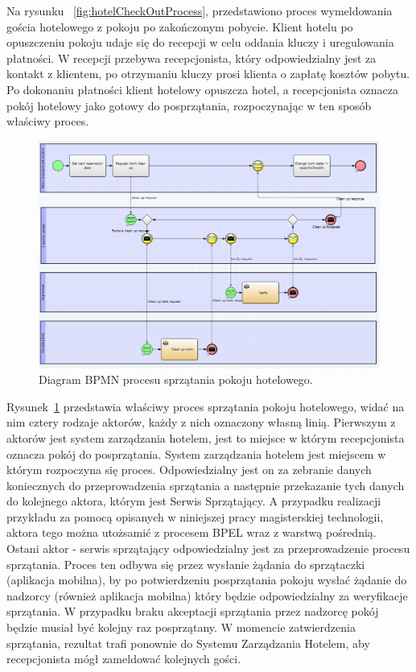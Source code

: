 Na rysunku ~\ref{fig:hotelCheckOutProcess}, przedstawiono proces wymeldowania gościa hotelowego z pokoju po zakończonym pobycie. Klient hotelu po opuszczeniu pokoju udaje się do recepcji w celu oddania kluczy i uregulowania płatności. W recepcji przebywa recepcjonista, który odpowiedzialny jest za kontakt z klientem, po otrzymaniu kluczy prosi klienta o zapłatę kosztów pobytu. Po dokonaniu płatności klient hotelowy opuszcza hotel, a recepcjonista oznacza pokój hotelowy jako gotowy do posprzątania, rozpoczynając w ten sposób właściwy proces. 

\begin{figure}[h]
\centerline{\includegraphics[scale=0.4]{roomCleanUpProcess}}
\caption{Diagram BPMN procesu sprzątania pokoju hotelowego.}
\label{fig:roomCleanUpProcess}
\end{figure}

Rysunek~\ref{fig:roomCleanUpProcess} przedstawia właściwy proces sprzątania pokoju hotelowego, widać na nim cztery rodzaje aktorów, każdy z nich oznaczony własną linią. Pierwszym z aktorów jest system zarządzania hotelem, jest to miejsce w którym recepcjonista oznacza pokój do posprzątania. System zarządzania hotelem jest miejscem w którym rozpoczyna się proces. Odpowiedzialny jest on za zebranie danych koniecznych do przeprowadzenia sprzątania a następnie przekazanie tych danych do kolejnego aktora, którym jest Serwis Sprzątający. A przypadku realizacji przykładu za pomocą opisanych w niniejszej pracy magisterskiej technologii, aktora tego można utożsamić z procesem BPEL wraz z warstwą pośrednią. Ostani aktor - serwis sprzątający odpowiedzialny jest za przeprowadzenie procesu sprzątania. Proces ten odbywa się przez wysłanie żądania do sprzątaczki (aplikacja mobilna), by po potwierdzeniu posprzątania pokoju wysłać żądanie do nadzorcy (również aplikacja mobilna) który będzie odpowiedzialny za weryfikacje sprzątania.  W przypadku braku akceptacji sprzątania przez nadzorcę pokój będzie musiał być kolejny raz posprzątany. W momencie zatwierdzenia sprzątania, rezultat trafi ponownie do Systemu Zarządzania Hotelem, aby recepcjonista mógł zameldować kolejnych gości. 

